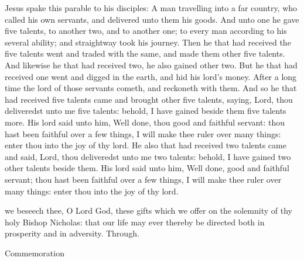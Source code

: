 
\vspace{-0.1\baselineskip}

 Jesus spake this parable to his disciples: A man travelling into a far country, who called his own servants, and delivered unto them his goods. And unto one he gave five talents, to another two, and to another one; to every man according to his several ability; and straightway took his journey. Then he that had received the five talents went and traded with the same, and made them other five talents. And likewise he that had received two, he also gained other two. But he that had received one went and digged in the earth, and hid his lord's money. After a long time the lord of those servants cometh, and reckoneth with them. And so he that had received five talents came and brought other five talents, saying, Lord, thou deliveredst unto me five talents: behold, I have gained beside them five talents more. His lord said unto him, Well done, thou good and faithful servant: thou hast been faithful over a few things, I will make thee ruler over many things: enter thou into the joy of thy lord. He also that had received two talents came and said, Lord, thou deliveredst unto me two talents: behold, I have gained two other talents beside them. His lord said unto him, Well done, good and faithful servant; thou hast been faithful over a few things, I will make thee ruler over many things: enter thou into the joy of thy lord.


\vspace{-0.4\baselineskip}

\secret

\vspace{-0.1\baselineskip}

 we beseech thee, O Lord God, these gifts which we offer on the solemnity of thy holy Bishop Nicholas: that our life may ever thereby be directed both in prosperity and in adversity. Through.

\begin{rubric}
	Commemoration 
\end{rubric}


